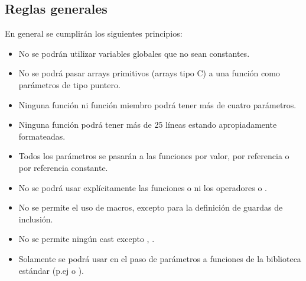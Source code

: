 \subsection{Reglas generales}

En general se cumplirán los siguientes principios:

\begin{itemize}

\item No se podrán utilizar variables globales que no sean constantes.

\item No se podrá pasar arrays primitivos (arrays tipo C)
a una función como parámetros de tipo puntero.

\item Ninguna función ni función miembro podrá tener más de cuatro parámetros.

\item Ninguna función podrá tener más de 25 líneas estando apropiadamente
formateadas.

\item Todos los parámetros se pasarán a las funciones por valor, por referencia
o por referencia constante.

\item No se podrá usar explícitamente las funciones 
o  ni los operadores  o .

\item No se permite el uso de macros, excepto para la definición de guardas de inclusión.

\item No se permite ningún cast excepto , 
.

\item Solamente se podrá usar  en el paso de parámetros a funciones
de la biblioteca estándar (p.ej  o ).

\end{itemize}
